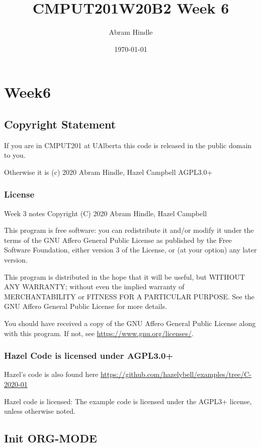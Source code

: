 \documentclass[11pt]{article}
\author{Abram Hindle}
\date{\today}
\title{CMPUT201W20B2 Week 6}
\begin{document}
\maketitle
\tableofcontents


\section{Week6}
\label{sec:org4cd44cd}
\subsection{Copyright Statement}
\label{sec:orgb88ea63}

If you are in CMPUT201 at UAlberta this code is released in the public
domain to you.

Otherwise it is (c) 2020 Abram Hindle, Hazel Campbell AGPL3.0+

\subsubsection{License}
\label{sec:org96177b1}

Week 3 notes
Copyright (C) 2020 Abram Hindle, Hazel Campbell

This program is free software: you can redistribute it and/or modify
it under the terms of the GNU Affero General Public License as
published by the Free Software Foundation, either version 3 of the
License, or (at your option) any later version.

This program is distributed in the hope that it will be useful,
but WITHOUT ANY WARRANTY; without even the implied warranty of
MERCHANTABILITY or FITNESS FOR A PARTICULAR PURPOSE.  See the
GNU Affero General Public License for more details.

You should have received a copy of the GNU Affero General Public License
along with this program.  If not, see \url{https://www.gnu.org/licenses/}.


\subsubsection{Hazel Code is licensed under AGPL3.0+}
\label{sec:org10c893b}

Hazel's code is also found here
\url{https://github.com/hazelybell/examples/tree/C-2020-01}

Hazel code is licensed: The example code is licensed under the AGPL3+
license, unless otherwise noted.

\subsection{Init ORG-MODE}
\label{sec:org7628c41}
\end{document}
